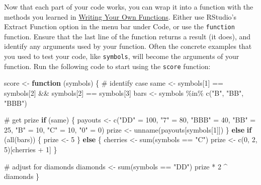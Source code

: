 \documentclass[
  letterpaper,
  DIV=11,
  numbers=noendperiod]{scrbook}
\newenvironment{Shaded}{\begin{snugshade}}{\end{snugshade}}
\newcommand{\CommentTok}[1]{\textcolor[rgb]{0.37,0.37,0.37}{#1}}
\newcommand{\ControlFlowTok}[1]{\textcolor[rgb]{0.00,0.23,0.31}{\textbf{#1}}}
\newcommand{\DecValTok}[1]{\textcolor[rgb]{0.68,0.00,0.00}{#1}}
\newcommand{\FunctionTok}[1]{\textcolor[rgb]{0.28,0.35,0.67}{#1}}
\newcommand{\NormalTok}[1]{\textcolor[rgb]{0.00,0.23,0.31}{#1}}
\newcommand{\OtherTok}[1]{\textcolor[rgb]{0.00,0.23,0.31}{#1}}
\newcommand{\SpecialCharTok}[1]{\textcolor[rgb]{0.37,0.37,0.37}{#1}}
\newcommand{\StringTok}[1]{\textcolor[rgb]{0.13,0.47,0.30}{#1}}
\begin{document}
Now that each part of your code works, you can wrap it into a function
with the methods you learned in \hyperref[sec-write-functions]{Writing
Your Own Functions}. Either use RStudio's Extract Function option in the
menu bar under Code, or use the \texttt{function} function. Ensure that
the last line of the function returns a result (it does), and identify
any arguments used by your function. Often the concrete examples that
you used to test your code, like \texttt{symbols}, will become the
arguments of your function. Run the following code to start using the
\texttt{score} function:

\begin{Shaded}
\begin{Highlighting}[]
\NormalTok{score }\OtherTok{\textless{}{-}} \ControlFlowTok{function}\NormalTok{ (symbols) \{}
  \CommentTok{\# identify case}
\NormalTok{  same }\OtherTok{\textless{}{-}}\NormalTok{ symbols[}\DecValTok{1}\NormalTok{] }\SpecialCharTok{==}\NormalTok{ symbols[}\DecValTok{2}\NormalTok{] }\SpecialCharTok{\&\&}\NormalTok{ symbols[}\DecValTok{2}\NormalTok{] }\SpecialCharTok{==}\NormalTok{ symbols[}\DecValTok{3}\NormalTok{]}
\NormalTok{  bars }\OtherTok{\textless{}{-}}\NormalTok{ symbols }\SpecialCharTok{\%in\%} \FunctionTok{c}\NormalTok{(}\StringTok{"B"}\NormalTok{, }\StringTok{"BB"}\NormalTok{, }\StringTok{"BBB"}\NormalTok{)}
  
  \CommentTok{\# get prize}
  \ControlFlowTok{if}\NormalTok{ (same) \{}
\NormalTok{    payouts }\OtherTok{\textless{}{-}} \FunctionTok{c}\NormalTok{(}\StringTok{"DD"} \OtherTok{=} \DecValTok{100}\NormalTok{, }\StringTok{"7"} \OtherTok{=} \DecValTok{80}\NormalTok{, }\StringTok{"BBB"} \OtherTok{=} \DecValTok{40}\NormalTok{, }\StringTok{"BB"} \OtherTok{=} \DecValTok{25}\NormalTok{, }
      \StringTok{"B"} \OtherTok{=} \DecValTok{10}\NormalTok{, }\StringTok{"C"} \OtherTok{=} \DecValTok{10}\NormalTok{, }\StringTok{"0"} \OtherTok{=} \DecValTok{0}\NormalTok{)}
\NormalTok{    prize }\OtherTok{\textless{}{-}} \FunctionTok{unname}\NormalTok{(payouts[symbols[}\DecValTok{1}\NormalTok{]])}
\NormalTok{  \} }\ControlFlowTok{else} \ControlFlowTok{if}\NormalTok{ (}\FunctionTok{all}\NormalTok{(bars)) \{}
\NormalTok{    prize }\OtherTok{\textless{}{-}} \DecValTok{5}
\NormalTok{  \} }\ControlFlowTok{else}\NormalTok{ \{}
\NormalTok{    cherries }\OtherTok{\textless{}{-}} \FunctionTok{sum}\NormalTok{(symbols }\SpecialCharTok{==} \StringTok{"C"}\NormalTok{)}
\NormalTok{    prize }\OtherTok{\textless{}{-}} \FunctionTok{c}\NormalTok{(}\DecValTok{0}\NormalTok{, }\DecValTok{2}\NormalTok{, }\DecValTok{5}\NormalTok{)[cherries }\SpecialCharTok{+} \DecValTok{1}\NormalTok{]}
\NormalTok{  \}}
  
  \CommentTok{\# adjust for diamonds}
\NormalTok{  diamonds }\OtherTok{\textless{}{-}} \FunctionTok{sum}\NormalTok{(symbols }\SpecialCharTok{==} \StringTok{"DD"}\NormalTok{)}
\NormalTok{  prize }\SpecialCharTok{*} \DecValTok{2} \SpecialCharTok{\^{}}\NormalTok{ diamonds}
\NormalTok{\}}
\end{Highlighting}
\end{Shaded}
\end{document}
